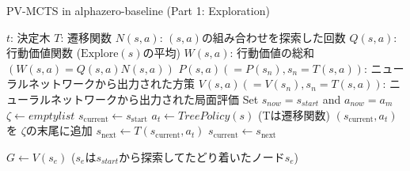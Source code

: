 \newpage
\begin{algorithm}
    \caption{PV-MCTS in alphazero-baseline (Part 1: Exploration)}
    \begin{algorithmic}[1]
        \State $t$: 決定木
        \State $T$: 遷移関数
        \State $N(s, a)$: $(s, a)$の組み合わせを探索した回数
        \State $Q(s, a)$: 行動価値関数 ($\textrm{Explore}(s)$の平均)
        \State $W(s, a)$: 行動価値の総和$(W(s, a)=Q(s, a)N(s, a))$
        \State $P(s, a)(=P(s_n), s_n=T(s, a))$: 
        \State ニューラルネットワークから出力された方策
        \State $V(s, a)(=V(s_n), s_n=T(s, a))$: 
        \State ニューラルネットワークから出力された局面評価
            \State Set $s_{now} = s_{start}$ and $a_{now} = a_m$
                \State $\zeta \gets empty list$
                \State $s_{\text{current}} \gets s_{\text{start}}$
                    \State $a_t \gets TreePolicy(s)$
                    \State (Tは遷移関数)
                    \State $(s_{\text{current}}, a_t)$を $\zeta $の末尾に追加
                    \State $s_{\text{next}} \gets T(s_{\text{current}}, a_t)$
                    \State $s_{\text{current}} \gets s_{\text{next}}$
                    
                \EndWhile
                \State $G \gets V(s_e)$ 
                \State($s_e$は$s_{start}$から探索してたどり着いたノード$s_e$)
                \State {}
            \EndFor
        \EndFunction
        
        
    \end{algorithmic}
\end{algorithm}
